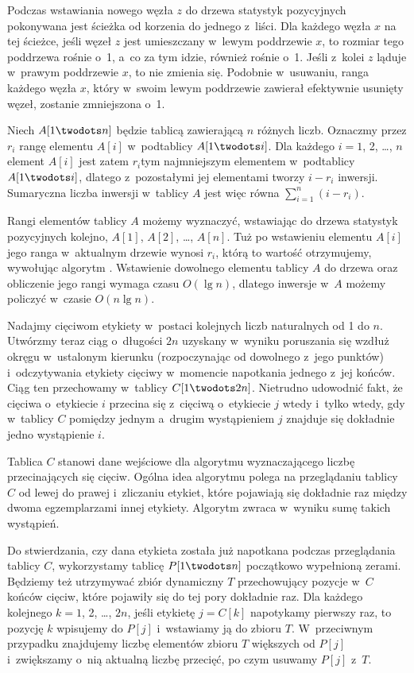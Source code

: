 Podczas wstawiania nowego węzła $z$ do drzewa statystyk pozycyjnych pokonywana jest ścieżka od korzenia do jednego z~liści.
Dla każdego węzła $x$ na tej ścieżce, jeśli węzeł $z$ jest umieszczany w~lewym poddrzewie $x$, to rozmiar tego poddrzewa rośnie o~1, a~co za tym idzie, również  rośnie o~1.
Jeśli z~kolei $z$ ląduje w~prawym poddrzewie $x$, to  nie zmienia się.
Podobnie w~usuwaniu, ranga każdego węzła $x$, który w~swoim lewym poddrzewie zawierał efektywnie usunięty węzeł, zostanie zmniejszona o~1.

\exercise %
Niech $A[1\twodots n]$ będzie tablicą zawierającą $n$ różnych liczb.
Oznaczmy przez $r_i$ rangę elementu $A[i]$ w~podtablicy $A[1\twodots i]$.
Dla każdego $i=1$, 2, \dots, $n$ element $A[i]$ jest zatem $r_i$\nbhyphen tym najmniejszym elementem w~podtablicy $A[1\twodots i]$, dlatego z~pozostałymi jej elementami tworzy $i-r_i$ inwersji.
Sumaryczna liczba inwersji w~tablicy $A$ jest więc równa $\sum_{i=1}^n(i-r_i)$.

Rangi elementów tablicy $A$ możemy wyznaczyć, wstawiając do drzewa statystyk pozycyjnych kolejno, $A[1]$, $A[2]$, \dots, $A[n]$.
Tuż po wstawieniu elementu $A[i]$ jego ranga w~aktualnym drzewie wynosi $r_i$, którą to wartość otrzymujemy, wywołując algorytm .
Wstawienie dowolnego elementu tablicy $A$ do drzewa oraz obliczenie jego rangi wymaga czasu $O(\lg n)$, dlatego inwersje w~$A$ możemy policzyć w~czasie $O(n\lg n)$.

\exercise %
Nadajmy cięciwom etykiety w~postaci kolejnych liczb naturalnych od 1 do $n$.
Utwórzmy teraz ciąg o~długości $2n$ uzyskany w~wyniku poruszania się wzdłuż okręgu w~ustalonym kierunku (rozpoczynając od dowolnego z~jego punktów) i~odczytywania etykiety cięciwy w~momencie napotkania jednego z~jej końców.
Ciąg ten przechowamy w~tablicy $C[1\twodots2n]$.
Nietrudno udowodnić fakt, że cięciwa o~etykiecie $i$ przecina się z~cięciwą o~etykiecie $j$ wtedy i~tylko wtedy, gdy w~tablicy $C$ pomiędzy jednym a~drugim wystąpieniem $j$ znajduje się dokładnie jedno wystąpienie $i$.

Tablica $C$ stanowi dane wejściowe dla algorytmu  wyznaczającego liczbę przecinających się cięciw.
Ogólna idea algorytmu polega na przeglądaniu tablicy $C$ od lewej do prawej i~zliczaniu etykiet, które pojawiają się dokładnie raz między dwoma egzemplarzami innej etykiety.
Algorytm zwraca w~wyniku sumę takich wystąpień.

Do stwierdzania, czy dana etykieta została już napotkana podczas przeglądania tablicy $C$, wykorzystamy tablicę $P[1\twodots n]$ początkowo wypełnioną zerami.
Będziemy też utrzymywać zbiór dynamiczny $T$ przechowujący pozycje w~$C$ końców cięciw, które pojawiły się do tej pory dokładnie raz.
Dla każdego kolejnego $k=1$, 2, \dots, $2n$, jeśli etykietę $j=C[k]$ napotykamy pierwszy raz, to pozycję $k$ wpisujemy do $P[j]$ i~wstawiamy ją do zbioru $T$.
W~przeciwnym przypadku znajdujemy liczbę elementów zbioru $T$ większych od $P[j]$ i~zwiększamy o~nią aktualną liczbę przecięć, po czym usuwamy $P[j]$ z~$T$.

